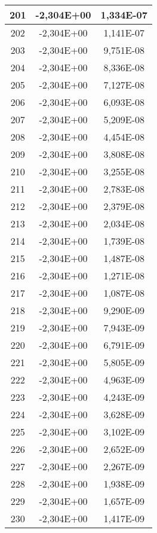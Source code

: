 \documentclass[12pt]{article}
\begin{document}
\begin{center}
\begin{longtable}{|c|c|c|}
    201	&     -2,304E+00	&   1,334E-07 \\ \hline
    202	&     -2,304E+00	&   1,141E-07 \\ \hline
    203	&     -2,304E+00	&   9,751E-08 \\ \hline
    204	&     -2,304E+00	&   8,336E-08 \\ \hline
    205	&     -2,304E+00	&   7,127E-08 \\ \hline
    206	&     -2,304E+00	&   6,093E-08 \\ \hline
    207	&     -2,304E+00	&   5,209E-08 \\ \hline
    208	&     -2,304E+00	&   4,454E-08 \\ \hline
    209	&     -2,304E+00	&   3,808E-08 \\ \hline
    210	&     -2,304E+00	&   3,255E-08 \\ \hline
    211	&     -2,304E+00	&   2,783E-08 \\ \hline
    212	&     -2,304E+00	&   2,379E-08 \\ \hline
    213	&     -2,304E+00	&   2,034E-08 \\ \hline
    214	&     -2,304E+00	&   1,739E-08 \\ \hline
    215	&     -2,304E+00	&   1,487E-08 \\ \hline
    216	&     -2,304E+00	&   1,271E-08 \\ \hline
    217	&     -2,304E+00	&   1,087E-08 \\ \hline
    218	&     -2,304E+00	&   9,290E-09 \\ \hline
    219	&     -2,304E+00	&   7,943E-09 \\ \hline
    220	&     -2,304E+00	&   6,791E-09 \\ \hline
    221	&     -2,304E+00	&   5,805E-09 \\ \hline
    222	&     -2,304E+00	&   4,963E-09 \\ \hline
    223	&     -2,304E+00	&   4,243E-09 \\ \hline
    224	&     -2,304E+00	&   3,628E-09 \\ \hline
    225	&     -2,304E+00	&   3,102E-09 \\ \hline
    226	&     -2,304E+00	&   2,652E-09 \\ \hline
    227	&     -2,304E+00	&   2,267E-09 \\ \hline
    228	&     -2,304E+00	&   1,938E-09 \\ \hline
    229	&     -2,304E+00	&   1,657E-09 \\ \hline
    230	&     -2,304E+00	&   1,417E-09 \\ \hline

\end{longtable}
\end{center}
\end{document}
